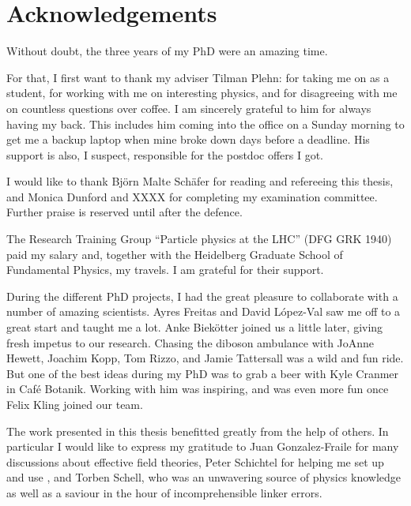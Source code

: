 
\chapter*{Acknowledgements}

Without doubt, the three years of my PhD were an amazing time.

For that, I first want to thank my adviser Tilman Plehn: for taking me
on as a student, for working with me on interesting physics, and for
disagreeing with me on countless questions over coffee. I am sincerely
grateful to him for always having my back. This includes him coming
into the office on a Sunday morning to get me a backup laptop when
mine broke down days before a deadline. His support is also, I
suspect, responsible for the postdoc offers I got.
%
%

I would like to thank Bj\"orn Malte Sch\"afer for reading and
refereeing this thesis, and Monica Dunford and XXXX  for completing my examination
committee. Further praise is reserved until after the defence.

The Research Training Group ``Particle physics at the LHC'' (DFG GRK
1940) paid my salary and, together with the Heidelberg Graduate School
of Fundamental Physics, my travels. I am grateful for their support.

During the different PhD projects, I had the great pleasure to
collaborate with a number of amazing scientists. Ayres Freitas and
David L\'opez-Val saw me off to a great start and taught me a
lot. Anke Biek\"otter joined us a little later, giving fresh impetus
to our research. Chasing the diboson ambulance with JoAnne Hewett,
Joachim Kopp, Tom Rizzo, and Jamie Tattersall was a wild and fun
ride. But one of the best ideas during my PhD was to grab a beer with
Kyle Cranmer in Caf\'e Botanik. Working with him was inspiring, and
was even more fun once Felix Kling joined our team.

The work presented in this thesis benefitted greatly from the help of
others. In particular I would like to express my gratitude to Juan
Gonzalez-Fraile for many discussions about effective field theories,
Peter Schichtel for helping me set up and use , and
Torben Schell, who was an unwavering source of physics knowledge as
well as a saviour in the hour of incomprehensible linker errors.

